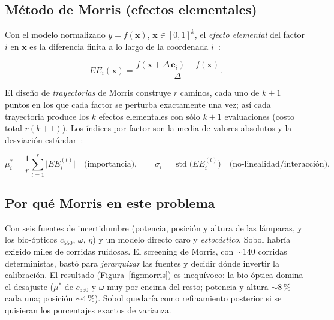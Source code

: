 \subsection{Método de Morris (efectos elementales)}\label{sec:morris}

Con el modelo normalizado $y=f(\mathbf{x})$, $\mathbf{x}\in[0,1]^k$, el
\emph{efecto elemental} del factor $i$ en $\mathbf{x}$ es la diferencia finita a lo
largo de la coordenada $i$~\cite{morris1991}:

\begin{equation}
EE_i(\mathbf{x}) = \frac{f(\mathbf{x}+\Delta\,\mathbf{e}_i) - f(\mathbf{x})}{\Delta}.
\label{eq:ee}
\end{equation}

El diseño de \emph{trayectorias} de Morris construye $r$ caminos, cada uno de $k+1$
puntos en los que cada factor se perturba exactamente una vez; así cada trayectoria
produce los $k$ efectos elementales con sólo $k+1$ evaluaciones (costo total
$r(k+1)$). Los índices por factor son la media de valores absolutos y la desviación
estándar~\cite{campolongo2007}:

\begin{equation}
\mu_i^{*} = \frac{1}{r}\sum_{t=1}^{r}\bigl|EE_i^{(t)}\bigr|
\quad\text{(importancia)},
\qquad
\sigma_i = \operatorname{std}\bigl(EE_i^{(t)}\bigr)
\quad\text{(no-linealidad/interacción)}.
\label{eq:mustar}
\end{equation}


\subsection{Por qué Morris en este problema}

Con seis fuentes de incertidumbre (potencia, posición y altura de las lámparas, y
los bio-ópticos $c_{550}$, $\omega$, $\eta$) y un modelo directo caro y
\emph{estocástico}, Sobol habría exigido miles de corridas ruidosas. El screening de
Morris, con $\sim$140 corridas deterministas, bastó para \emph{jerarquizar} las
fuentes y decidir dónde invertir la calibración. El resultado
(Figura~\ref{fig:morris}) es inequívoco: la bio-óptica domina el desajuste
($\mu^{*}$ de $c_{550}$ y $\omega$ muy por encima del resto; potencia y altura
$\sim$8\,\% cada una; posición $\sim$4\,\%). Sobol quedaría como refinamiento
posterior si se quisieran los porcentajes exactos de varianza.

